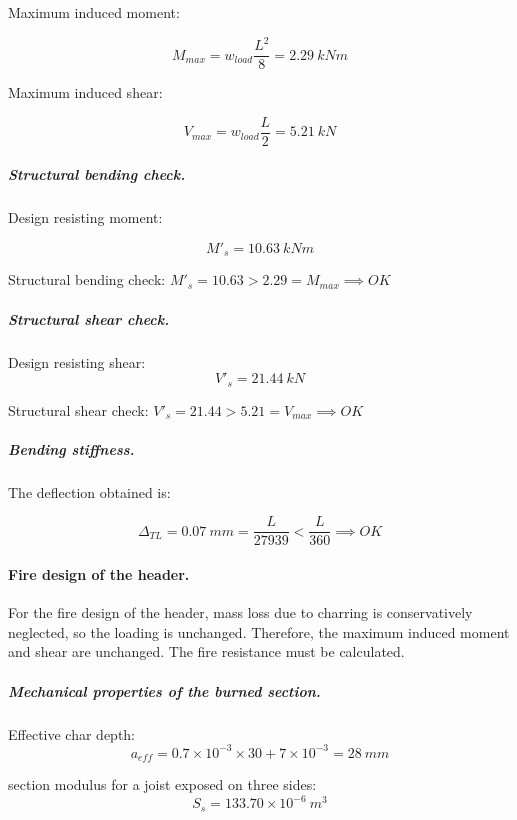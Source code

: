 \noindent Maximum induced moment:

\begin{equation}
  M_{max}= w_{load} \frac{L^2}{8}= 2.29\ kN m
\end{equation}

\noindent Maximum induced shear:

\begin{equation}
  V_{max}= w_{load} \frac{L}{2}= 5.21\ kN
\end{equation}

\subparagraph{Structural bending check.}

\noindent Design resisting moment:

\begin{equation}
  M'_s= 10.63\ kN m
\end{equation}

\noindent Structural bending check: $M'_s = 10.63 > 2.29 = M_{max} \implies OK$

\subparagraph{Structural shear check.}

\noindent Design resisting shear:
\begin{equation}
  V'_s= 21.44\ kN
\end{equation}

\noindent Structural shear check: $V'_s = 21.44 > 5.21 = V_{max} \implies OK$

\subparagraph{Bending stiffness.}
The deflection obtained is:

\begin{equation}
  \Delta_{TL}= 0.07\ mm= \frac{L}{27939} < \frac{L}{360} \implies OK
\end{equation}

\paragraph{Fire design of the header.}
For the fire design of the header, mass loss due to charring is conservatively neglected, so the loading is unchanged. Therefore, the maximum induced moment and shear are unchanged. The fire resistance must be calculated.

\subparagraph{Mechanical properties of the burned section.}

\noindent Effective char depth:
\begin{equation}
  a_{eff}= 0.7 \times 10^{-3} \times 30 + 7 \times 10^{-3}= 28\ mm
\end{equation}

\noindent section modulus for a joist exposed on three sides:
\begin{equation}
  S_s= 133.70 \times 10^{-6}\ m^3
\end{equation}

